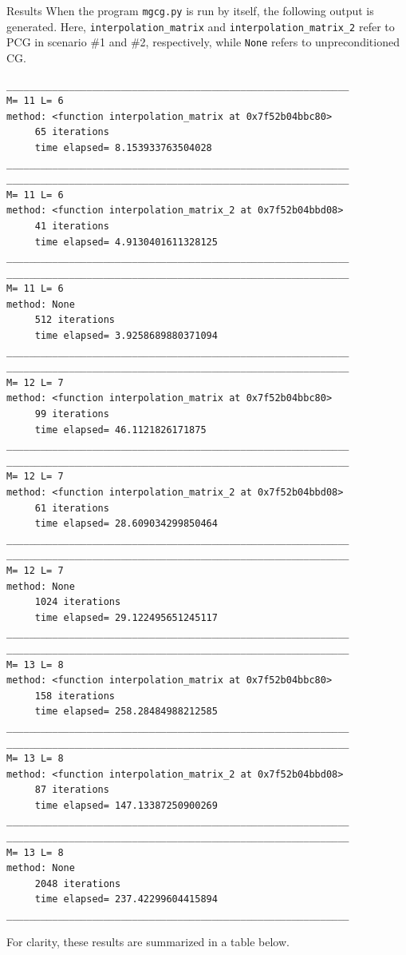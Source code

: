\documentclass[10pt]{article}
\theoremstyle{definition}
\begin{document}
\begin{section}{Results}
When the program \texttt{mgcg.py} is run by itself, the following output is generated. Here, \texttt{interpolation\_matrix} and \texttt{interpolation\_matrix\_2}
refer to PCG in scenario \#1 and \#2, respectively, while \texttt{None} refers to
unpreconditioned CG.
\begin{small}
\begin{verbatim}
____________________________________________________________
M= 11 L= 6
method: <function interpolation_matrix at 0x7f52b04bbc80>
	 65 iterations
	 time elapsed= 8.153933763504028
____________________________________________________________
____________________________________________________________
M= 11 L= 6
method: <function interpolation_matrix_2 at 0x7f52b04bbd08>
	 41 iterations
	 time elapsed= 4.9130401611328125
____________________________________________________________
____________________________________________________________
M= 11 L= 6
method: None
	 512 iterations
	 time elapsed= 3.9258689880371094
____________________________________________________________
____________________________________________________________
M= 12 L= 7
method: <function interpolation_matrix at 0x7f52b04bbc80>
	 99 iterations
	 time elapsed= 46.1121826171875
____________________________________________________________
____________________________________________________________
M= 12 L= 7
method: <function interpolation_matrix_2 at 0x7f52b04bbd08>
	 61 iterations
	 time elapsed= 28.609034299850464
____________________________________________________________
____________________________________________________________
M= 12 L= 7
method: None
	 1024 iterations
	 time elapsed= 29.122495651245117
____________________________________________________________
____________________________________________________________
M= 13 L= 8
method: <function interpolation_matrix at 0x7f52b04bbc80>
	 158 iterations
	 time elapsed= 258.28484988212585
____________________________________________________________
____________________________________________________________
M= 13 L= 8
method: <function interpolation_matrix_2 at 0x7f52b04bbd08>
	 87 iterations
	 time elapsed= 147.13387250900269
____________________________________________________________
____________________________________________________________
M= 13 L= 8
method: None
	 2048 iterations
	 time elapsed= 237.42299604415894
____________________________________________________________

\end{verbatim}
\end{small}
For clarity, these results are summarized in a table below.


\end{section}
\end{document}
